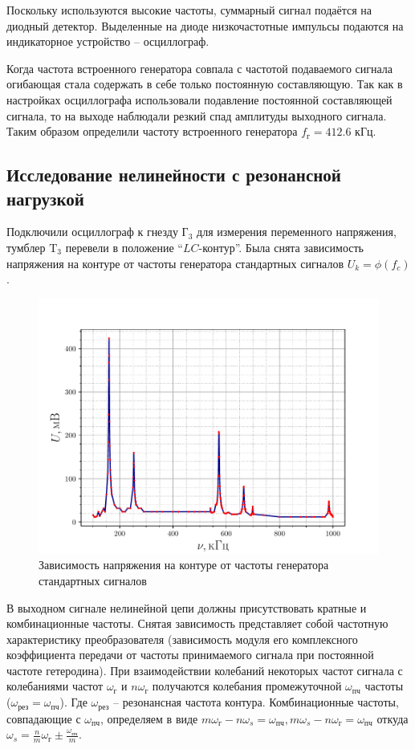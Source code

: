 Поскольку используются высокие частоты, суммарный сигнал подаётся на диодный детектор. Выделенные на диоде низкочастотные импульсы подаются на индикаторное устройство -- осциллограф.

Когда частота встроенного генератора совпала с частотой подаваемого сигнала огибающая стала содержать в себе только постоянную составляющую. Так как в настройках осциллографа использовали подавление постоянной составляющей сигнала, то на выходе наблюдали резкий спад амплитуды выходного сигнала. Таким образом определили частоту встроенного генератора $f_\text{г}=412.6\text{ кГц}$.

\subsection{Исследование нелинейности с резонансной нагрузкой}
Подключили осциллограф к гнезду $\text{Г}_3$ для измерения переменного напряжения,
тумблер $\text{T}_3$ перевели в положение “$LC$-контур”.
Была снята зависимость напряжения на контуре от частоты генератора стандартных сигналов $U_k=\phi(f_c)$.
\begin{figure}[h!]
	\centering
	\includegraphics[width=\textwidth]{fig/exp2.pdf}
	\caption{Зависимость напряжения на контуре от частоты генератора стандартных сигналов}
	\label{exp:2}
\end{figure}

В выходном сигнале нелинейной цепи должны присутствовать кратные и комбинационные частоты. Снятая зависимость представляет собой частотную характеристику преобразователя (зависимость модуля его комплексного коэффициента передачи от частоты принимаемого сигнала при постоянной частоте гетеродина). При взаимодействии колебаний некоторых
частот сигнала с колебаниями частот 
$\omega_{\text{г}}$ и $n\omega_{\text{г}}$ 
получаются колебания промежуточной
$\omega_{\text{пч}}$ частоты 
($\omega_{\text{рез}} = \omega_{\text{пч}}$). 
Где $\omega_{\text{рез}}$ -- резонансная частота контура. Комбинационные частоты, совпадающие с 
$\omega_{\text{пч}}$, определяем в виде 
$m\omega_{\text{г}} - n\omega_s = \omega_{\text{пч}}, 
m\omega_s - n\omega_{\text{г}} = \omega_{\text{пч}}$ откуда 
$\omega_s =\frac{n}{m}\omega_{\text{г}}\pm\frac{\omega_{\text{пч}}}{m}$.

